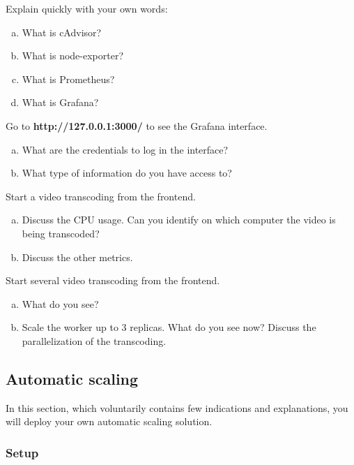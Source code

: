 \documentclass[a4paper,11pt]{exam}
\begin{document}
\begin{questions}

	\question Explain quickly with your own words:
	\begin{enumerate}[(a)]
		\item What is cAdvisor?
		\item What is node-exporter?
		\item What is Prometheus?
		\item What is Grafana?
	\end{enumerate}
	
	\question Go to \textbf{http://127.0.0.1:3000/} to see the Grafana interface.
	\begin{enumerate}[(a)]
		\item What are the credentials to log in the interface?
		\item What type of information do you have access to?
	\end{enumerate}
	
	\question Start a video transcoding from the frontend.
	\begin{enumerate}[(a)]
		\item Discuss the CPU usage. Can you identify on which computer the video is being transcoded?
		\item Discuss the other metrics.
	\end{enumerate}

	\question Start several video transcoding from the frontend.
	\begin{enumerate}[(a)]
		\item What do you see?  
		\item Scale the worker up to 3 replicas. What do you see now? Discuss the parallelization of the transcoding.
	\end{enumerate}
	
\end{questions}

\clearpage

\subsection{Automatic scaling}

In this section, which voluntarily contains few indications and explanations, you will deploy your own automatic scaling solution.

\subsubsection{Setup}
\end{document}
